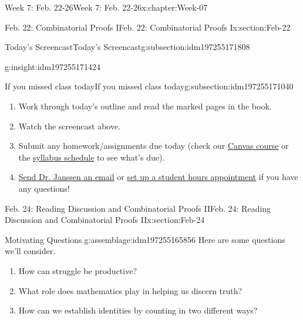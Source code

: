 \documentclass[oneside,10pt,]{book}
\numberwithin{equation}{section}
\begin{document}
\begin{chapterptx}{Week 7: Feb. 22-26}{}{Week 7: Feb. 22-26}{}{}{x:chapter:Week-07}
\begin{sectionptx}{Feb. 22: Combinatorial Proofs I}{}{Feb. 22: Combinatorial Proofs I}{}{}{x:section:Feb-22}
\begin{subsectionptx}{Today's Screencast}{}{Today's Screencast}{}{}{g:subsection:idm197255171808}
\begin{insight}{}{g:insight:idm197255171424}
\begin{tcbraster}[raster columns=2, raster column skip=1pt, raster halign=center, raster force size=false, raster left skip=0pt, raster right skip=0pt]
\end{tcbraster}%
\end{insight}
\end{subsectionptx}
%
%
\typeout{************************************************}
\typeout{************************************************}
%
\begin{subsectionptx}{If you missed class today}{}{If you missed class today}{}{}{g:subsection:idm197255171040}
%
\begin{enumerate}
\item{}Work through today's outline and read the marked pages in the book.%
\item{}Watch the screencast above.%
\item{}Submit any homework\slash{}assignments due today (check our \href{https://dordt.instructure.com/courses/3110050}{Canvas course} or the \href{https://prof.mkjanssen.org/ds/index.html\#schedule}{syllabus schedule} to see what's due).%
\item{}\href{mailto:mike.janssen@dordt.edu}{Send Dr. Janssen an email} or \href{https://calendly.com/mkjanssen/student-hours}{set up a student hours appointment} if you have any questions!%
\end{enumerate}
\end{subsectionptx}
\end{sectionptx}
%
%
\typeout{************************************************}
\typeout{************************************************}
%
\begin{sectionptx}{Feb. 24: Reading Discussion and Combinatorial Proofs II}{}{Feb. 24: Reading Discussion and Combinatorial Proofs II}{}{}{x:section:Feb-24}
\begin{introduction}{}%
\begin{assemblage}{Motivating Questions.}{g:assemblage:idm197255165856}%
Here are some questions we'll consider. %
\begin{enumerate}
\item{}How can struggle be productive?%
\item{}What role does mathematics play in helping us discern truth?%
\item{}How can we establish identities by counting in two different ways?%
\end{enumerate}
%
\end{assemblage}
\end{introduction}%
%
%
\typeout{************************************************}

\end{sectionptx}
\end{chapterptx}
\end{document}
